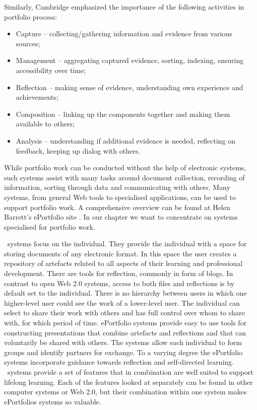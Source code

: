 Similarly, Cambridge \citeyearpar{Cambridge2010} emphasized the importance of
the following activities in portfolio process:

\begin{itemize}
  \item Capture -- collecting/gathering information and evidence from various
  sources;
  \item Management -- aggregating captured evidence, sorting, indexing, ensuring
  accessibility over time;
  \item Reflection -- making sense of evidence, understanding own experience and
  achievements;
  \item Composition -- linking up the components together and making them
  available to others;
  \item Analysis -- understanding if additional evidence is needed, reflecting
  on feedback, keeping up dialog with others.
\end{itemize}

While portfolio work can be conducted without the help of electronic systems,
such systems assist with many tasks around document collection, recording of
information, sorting through data and communicating with others. Many systems,
from general Web tools to specialised applications, can be used to support
portfolio work. A comprehensive overview can be found at Helen Barrett's
ePortfolio site \citep{Barrett2008}. In our chapter we want to concentrate
on systems specialised for portfolio work.

\ep~systems focus on the individual. They provide the individual with a
space for storing documents of any electronic format. In this space the user
creates a repository of artefacts related to all aspects of their learning and
professional development. There are tools for reflection, commonly in form of
blogs. In contrast to open Web 2.0 systems, access to both files and reflections
is by default set to the individual. There is no hierarchy between users in
which one higher-level user could see the work of a lower-level user. The
individual can select to share their work with others and has full control over
whom to share with, for which period of time. ePortfolio systems provide easy to
use tools for constructing presentations that combine artefacts and reflections
and that can voluntarily be shared with others. The systems allow each
individual to form groups and identify partners for exchange. To a varying
degree the ePortfolio systems incorporate guidance towards reflection and
self-directed learning. \ep~systems provide a set of features that in
combination are well suited to support lifelong learning. Each of the features
looked at separately can be found in other computer systems or Web 2.0, but
their combination within one system makes ePortfolios systems so valuable.

